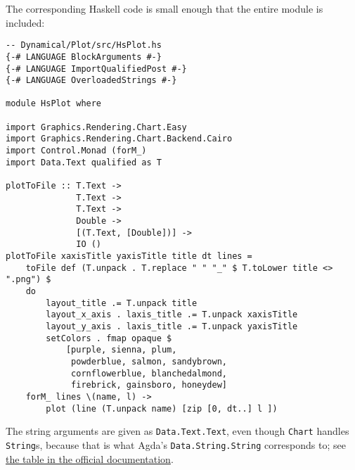 The corresponding Haskell code is small enough that the entire module is included:

\begin{verbatim}
-- Dynamical/Plot/src/HsPlot.hs
{-# LANGUAGE BlockArguments #-}
{-# LANGUAGE ImportQualifiedPost #-}
{-# LANGUAGE OverloadedStrings #-}

module HsPlot where

import Graphics.Rendering.Chart.Easy
import Graphics.Rendering.Chart.Backend.Cairo
import Control.Monad (forM_)
import Data.Text qualified as T

plotToFile :: T.Text ->
              T.Text -> 
              T.Text -> 
              Double -> 
              [(T.Text, [Double])] -> 
              IO ()
plotToFile xaxisTitle yaxisTitle title dt lines = 
    toFile def (T.unpack . T.replace " " "_" $ T.toLower title <> ".png") $ 
    do
        layout_title .= T.unpack title
        layout_x_axis . laxis_title .= T.unpack xaxisTitle
        layout_y_axis . laxis_title .= T.unpack yaxisTitle
        setColors . fmap opaque $ 
            [purple, sienna, plum, 
             powderblue, salmon, sandybrown, 
             cornflowerblue, blanchedalmond, 
             firebrick, gainsboro, honeydew]
    forM_ lines \(name, l) ->
        plot (line (T.unpack name) [zip [0, dt..] l ])
\end{verbatim}

The string arguments are given as \texttt{Data.Text.Text}, even though \texttt{Chart} handles \texttt{String}s, because that is what Agda's \texttt{Data.String.String} corresponds to; see \href{https://agda.readthedocs.io/en/v2.6.2.2/language/foreign-function-interface.html#built-in-types}{the table in the official documentation}.


